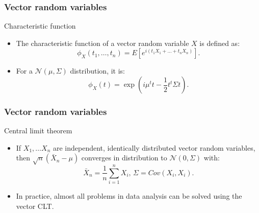 \documentclass[main.tex]{subfiles}
\begin{document}
\begin{frame}
    \frametitle{Vector random variables}
\begin{block}{Characteristic function}
    \begin{itemize}
        \item<+-> The characteristic function of a vector random variable $X$ is defined as:
        \begin{equation}
            \phi_X(t_1,\dots,t_n) = E\left[ e^{i \left( t_1X_1 + \dots + t_n X_n \right)} \right].
        \end{equation}
        \item<+-> For a $\mathcal{N}\left( \mu, \Sigma \right)$ distribution, it is:
        \begin{equation}
            \phi_X(t)= \exp \left( i \mu^t t- \frac{1}{2} t^t \Sigma t\right).
        \end{equation}
        \end{itemize}
\end{block}
\end{frame}
\begin{frame}
    \frametitle{Vector random variables}
\begin{block}{Central limit theorem}
    \begin{itemize}
        \item<+-> If $X_1, \dots X_n$ are independent, identically distributed 
        vector random variables, then $\sqrt{n} \left( \bar{X}_n - \mu \right)$
        converges in distribution to $\mathcal{N}\left( 0,  \Sigma \right)$ with:
        \begin{equation}
            \bar{X}_n = \frac{1}{n} \sum_{i=1}^n X_i, \, \Sigma = Cov(X_i, X_i).
        \end{equation}
        \item<+-> In practice, almost all problems in data analysis can be solved 
        using the vector CLT.
        \end{itemize}
\end{block}
\end{frame}
\end{document}
